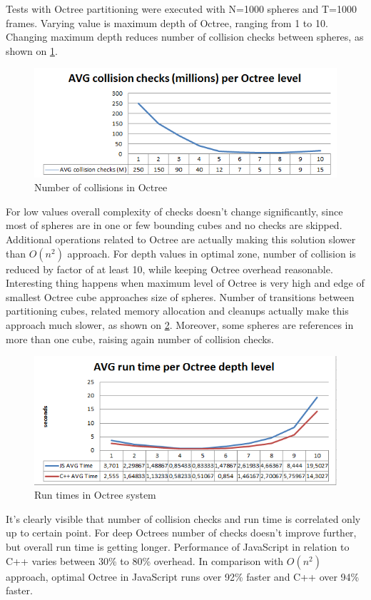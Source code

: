 Tests with Octree partitioning were executed with N=1000 spheres and T=1000 frames. Varying value is maximum depth of Octree, ranging from 1 to 10. 
Changing maximum depth reduces number of collision checks between spheres, as shown on \ref{img:octree-collisions}.

\begin{figure}[h!]
  \caption{Number of collisions in Octree}
  \label{img:octree-collisions}
  \centering
	\includegraphics[width=16cm]{spheres/octree-collisions.png}
\end{figure}

For low values overall complexity of checks doesn't change significantly, since most of spheres are in one or few bounding cubes and no checks are skipped. Additional operations related to Octree are actually making this solution slower than $O(n^2)$ approach. For depth values in optimal zone, number of collision is reduced by factor of at least 10, while keeping Octree overhead reasonable. Interesting thing happens when maximum level of Octree is very high and edge of smallest Octree cube approaches size of spheres. Number of transitions between partitioning cubes, related memory allocation and cleanups actually make this approach much slower, as shown on \ref{img:octree-time}. Moreover, some spheres are references in more than one cube, raising again number of collision checks.

\begin{figure}[h!]
  \caption{Run times in Octree system}
  \label{img:octree-time}
  \centering
	\includegraphics[width=16cm]{spheres/octree-time.png}
\end{figure}

It's clearly visible that number of collision checks and run time is correlated  only up to certain point. For deep Octrees number of checks doesn't improve further, but overall run time is getting longer. Performance of JavaScript in relation to C++ varies between 30\% to 80\% overhead. In comparison with $O(n^2)$ approach, optimal Octree in JavaScript runs over 92\% faster and C++ over 94\% faster. 
